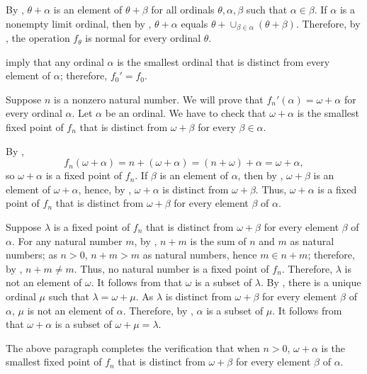 \documentclass{article}
\begin{document}
\begin{solution}[\ref{exe:hqet5ayg}]
  \label{sol:2a3fy4oi}
  By , \(\theta + \alpha \) is an element of
  \(\theta + \beta\) for all ordinals \(\theta, \alpha, \beta\) such
  that \(\alpha \in \beta\).  If \(\alpha\) is a nonempty limit
  ordinal, then by , \(\theta + \alpha\) equals
  \(\theta + \cup_{\beta \in \alpha} (\theta + \beta)\).  Therefore,
  by , the operation \(f_\theta\) is normal for
  every ordinal \(\theta\).

   imply that any ordinal
  \(\alpha\) is the smallest ordinal that is distinct from every
  element of \(\alpha\); therefore, \(f_0' = f_0\).

  Suppose \(n\) is a nonzero natural number.  We will prove that
  \(f_n'(\alpha) = \omega + \alpha\) for every ordinal \(\alpha\).
  Let \(\alpha\) be an ordinal.  We have to check that
  \(\omega + \alpha\) is the smallest fixed point of \(f_n\) that is
  distinct from \(\omega + \beta\) for every \(\beta \in \alpha\).

  By ,
  \begin{displaymath}
    f_n(\omega + \alpha) =
    n + (\omega + \alpha) =
    (n + \omega) + \alpha =
    \omega + \alpha,
  \end{displaymath}
  so \(\omega + \alpha\) is a fixed point of \(f_n\).  If \(\beta\) is
  an element of \(\alpha\), then by ,
  \(\omega + \beta\) is an element of \(\omega + \alpha\), hence, by
  , \(\omega + \alpha\) is distinct from
  \(\omega + \beta\).  Thus, \(\omega + \alpha\) is a fixed point of
  \(f_n\) that is distinct from \(\omega + \beta\) for every element
  \(\beta\) of \(\alpha\).

  Suppose \(\lambda\) is a fixed point of \(f_n\) that is distinct
  from \(\omega + \beta\) for every element \(\beta\) of \(\alpha\).
  For any natural number \(m\), by , \(n + m\) is
  the sum of \(n\) and \(m\) as natural numbers; as \(n > 0\),
  \(n + m > m\) as natural numbers, hence \(m \in n + m\); therefore,
  by , \(n + m \neq m\).  Thus, no natural number
  is a fixed point of \(f_n\).  Therefore, \(\lambda\) is not an
  element of \(\omega\).  It follows from
   that \(\omega\) is a subset of
  \(\lambda\).  By , there is a unique ordinal
  \(\mu\) such that \(\lambda = \omega + \mu\).  As \(\lambda\) is
  distinct from \(\omega + \beta\) for every element \(\beta\) of
  \(\alpha\), \(\mu\) is not an element of \(\alpha\).  Therefore, by
  , \(\alpha\) is a subset of \(\mu\).
  It follows from  that \(\omega + \alpha\) is a
  subset of \(\omega + \mu = \lambda\).

  The above paragraph completes the verification that when \(n > 0\),
  \(\omega + \alpha\) is the smallest fixed point of \(f_n\) that is
  distinct from \(\omega + \beta\) for every element \(\beta\) of
  \(\alpha\).
\end{solution}
\end{document}
